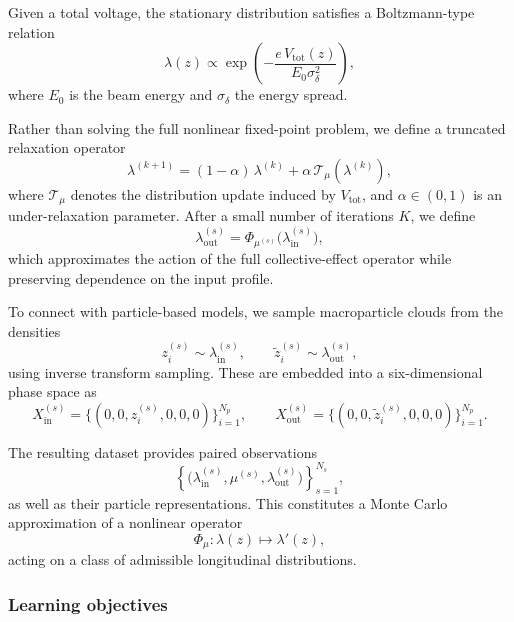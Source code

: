 \documentclass[11pt,a4paper]{article}
\begin{document}
\begin{sloppypar}
Given a total voltage, the stationary distribution satisfies a Boltzmann-type relation
\begin{equation}
\lambda(z) \propto \exp\left(-\frac{e\,V_{\mathrm{tot}}(z)}{E_0 \sigma_\delta^2}\right),
\end{equation}
where $E_0$ is the beam energy and $\sigma_\delta$ the energy spread.


Rather than solving the full nonlinear fixed-point problem, we define a truncated relaxation operator
\begin{equation}
\lambda^{(k+1)} = (1-\alpha)\,\lambda^{(k)} + \alpha\,\mathcal{T}_\mu(\lambda^{(k)}),
\end{equation}
where $\mathcal{T}_\mu$ denotes the distribution update induced by $V_{\mathrm{tot}}$, and $\alpha \in (0,1)$ is an under-relaxation parameter. After a small number of iterations $K$, we define
\begin{equation}
\lambda_{\mathrm{out}}^{(s)} = \Phi_{\mu^{(s)}}\big(\lambda_{\mathrm{in}}^{(s)}\big),
\end{equation}
which approximates the action of the full collective-effect operator while preserving dependence on the input profile.


To connect with particle-based models, we sample macroparticle clouds from the densities
\begin{equation}
z_i^{(s)} \sim \lambda_{\mathrm{in}}^{(s)}, 
\qquad
\tilde{z}_i^{(s)} \sim \lambda_{\mathrm{out}}^{(s)},
\end{equation}
using inverse transform sampling. These are embedded into a six-dimensional phase space as
\begin{equation}
X_{\mathrm{in}}^{(s)} = \{(0,0,z_i^{(s)},0,0,0)\}_{i=1}^{N_p}, 
\qquad
X_{\mathrm{out}}^{(s)} = \{(0,0,\tilde{z}_i^{(s)},0,0,0)\}_{i=1}^{N_p}.
\end{equation}

The resulting dataset provides paired observations
\begin{equation}
\left\{
\big(\lambda_{\mathrm{in}}^{(s)}, \mu^{(s)}, \lambda_{\mathrm{out}}^{(s)}\big)
\right\}_{s=1}^{N_s},
\end{equation}
as well as their particle representations. This constitutes a Monte Carlo approximation of a nonlinear operator
\begin{equation}
\Phi_\mu : \lambda(z) \mapsto \lambda'(z),
\end{equation}
acting on a class of admissible longitudinal distributions.


\subsubsection{Learning objectives}
\label{subsubsec:learning-objectives}


\end{sloppypar}
\end{document}
